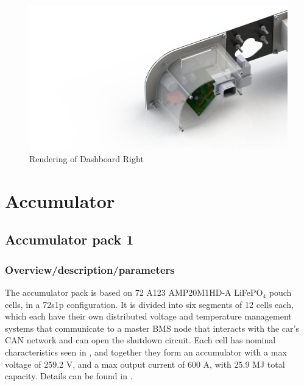 \documentclass{article}
\begin{document}
\begin{figure}[H]
\centering
	\includegraphics[width=0.6\linewidth]{dashboard_right}
	\caption{Rendering of Dashboard Right}
	\label{dashboard_right}
\end{figure}


\section{Accumulator}\label{accumulator}
\subsection{Accumulator pack 1}\label{accumulator_pack_1}
\subsubsection{Overview/description/parameters}\label{accumulator_overview}

The accumulator pack is based on 72 A123 AMP20M1HD-A LiFePO$_4$ pouch cells, in a 72s1p configuration. It is divided into six segments of 12 cells each, which each have their own distributed voltage and temperature management systems that communicate to a master BMS node that interacts with the car's CAN network and can open the shutdown circuit. Each cell has nominal characteristics seen in , and together they form an accumulator with a max voltage of 259.2 V, and a max output current of 600 A, with 25.9 MJ total capacity. Details can be found in .  
\end{document}
